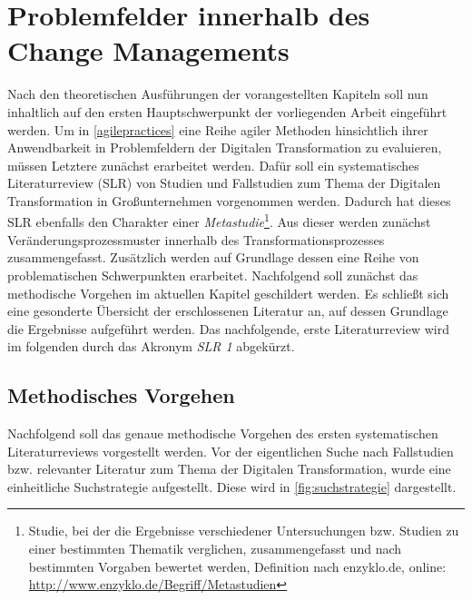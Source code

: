 \chapter{Problemfelder innerhalb des Change Managements}
\label{problemfields}


Nach den theoretischen Ausführungen der vorangestellten Kapiteln soll nun inhaltlich auf den ersten Hauptschwerpunkt der vorliegenden Arbeit eingeführt werden. Um in \ref{agilepractices} eine Reihe agiler Methoden hinsichtlich ihrer Anwendbarkeit in Problemfeldern der Digitalen Transformation zu evaluieren, müssen Letztere zunächst erarbeitet werden. Dafür soll ein systematisches Literaturreview (\gls{SLR}) von Studien und Fallstudien zum Thema der Digitalen Transformation in Großunternehmen vorgenommen werden. Dadurch hat dieses SLR ebenfalls den Charakter einer \textit{Metastudie}\footnote{Studie, bei der die Ergebnisse verschiedener Untersuchungen bzw. Studien zu einer bestimmten Thematik verglichen, zusammengefasst und nach bestimmten Vorgaben bewertet werden, Definition nach enzyklo.de, online: \url{http://www.enzyklo.de/Begriff/Metastudien}}. Aus dieser werden zunächst Veränderungsprozessmuster innerhalb des Transformationsprozesses  zusammengefasst.  Zusätzlich werden auf Grundlage dessen eine Reihe von problematischen Schwerpunkten erarbeitet. Nachfolgend soll zunächst das methodische Vorgehen im aktuellen Kapitel geschildert werden. Es schließt sich eine gesonderte Übersicht der erschlossenen Literatur an, auf dessen Grundlage  die Ergebnisse aufgeführt werden.  Das nachfolgende, erste Literaturreview wird im folgenden durch das Akronym \textit{SLR 1} abgekürzt.

\section{Methodisches Vorgehen}
\label{problemfields:methods}


Nachfolgend soll das genaue methodische Vorgehen des ersten systematischen Literaturreviews vorgestellt werden. Vor der eigentlichen Suche nach Fallstudien bzw. relevanter Literatur zum Thema der Digitalen Transformation, wurde eine einheitliche Suchstrategie aufgestellt. Diese wird in \ref{fig:suchstrategie} dargestellt. 


